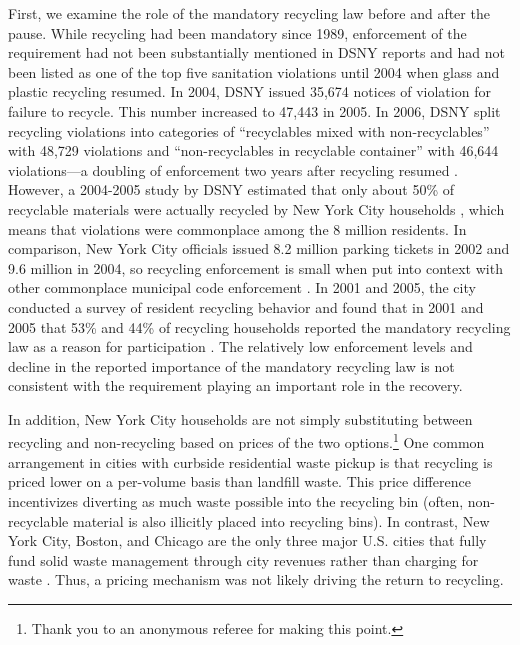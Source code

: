 \documentclass[12pt]{article}
\begin{document}
First, we examine the role of the mandatory recycling law before and after the pause.  While recycling had been mandatory since 1989, enforcement of the requirement had not been substantially mentioned in DSNY reports and had not been listed as one of the top five sanitation violations until 2004 when glass and plastic recycling resumed.  In 2004, DSNY issued 35,674 notices of violation for failure to recycle.  This number increased to 47,443 in 2005.  In 2006, DSNY split recycling violations into categories of ``recyclables mixed with non-recyclables'' with 48,729 violations and ``non-recyclables in recyclable container'' with 46,644 violations---a doubling of enforcement two years after recycling resumed \citep{dsnyreports}.  However, a 2004-2005 study by DSNY estimated that only about 50\% of recyclable materials were actually recycled by New York City households \citep{dsnywcs2005}, which means that violations were commonplace among the 8 million residents.  In comparison, New York City officials issued 8.2 million parking tickets in 2002 and 9.6 million in 2004, so recycling enforcement is small when put into context with other commonplace municipal code enforcement \citep{nypost}.  In 2001 and 2005, the city conducted a survey of resident recycling behavior and found that in 2001 and 2005 that 53\% and 44\% of recycling households reported the mandatory recycling law as a reason for participation \citep{lange2007}.  The relatively low enforcement levels and decline in the reported importance of the mandatory recycling law is not consistent with the requirement playing an important role in the recovery.

In addition, New York City households are not simply substituting between recycling and non-recycling based on prices of the two options.\footnote{Thank you to an anonymous referee for making this point.} One common arrangement in cities with curbside residential waste pickup is that recycling is priced lower on a per-volume basis than landfill waste.  This price difference incentivizes diverting as much waste possible into the recycling bin (often, non-recyclable material is also illicitly placed into recycling bins).  In contrast, New York City, Boston, and Chicago are the only three major U.S. cities that fully fund solid waste management through city revenues rather than charging for waste \citep{cbcny2014}. Thus, a pricing mechanism was not likely driving the return to recycling.
\end{document}
